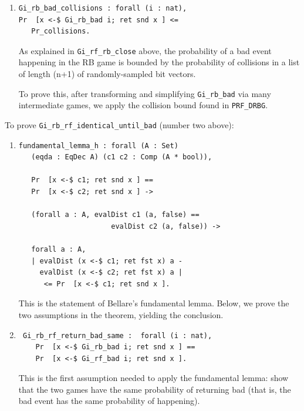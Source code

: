 \documentclass[12pt,lot, lof]{puthesis}
\newcommand{\li} {\lstinline}
\begin{document}
{\begin{enumerate}
                                              
\par
\item \begin{lstlisting}
Gi_rb_bad_collisions : forall (i : nat),
Pr  [x <-$ Gi_rb_bad i; ret snd x ] <= 
   Pr_collisions.
\end{lstlisting}

As explained in \li|Gi_rf_rb_close| above, the probability of a bad event happening in the RB game is bounded by the probability of collisions in a list of length (n+1) of randomly-sampled bit vectors. 

To prove this, after transforming and simplifying \li|Gi_rb_bad| via many intermediate games, we apply the collision bound found in \li|PRF_DRBG|.

\end{enumerate} 

To prove \lstinline|Gi_rb_rf_identical_until_bad| (number two above):

\begin{enumerate}
\par
\item \begin{lstlisting}
fundamental_lemma_h : forall (A : Set) 
   (eqda : EqDec A) (c1 c2 : Comp (A * bool)),
   
   Pr  [x <-$ c1; ret snd x ] == 
   Pr  [x <-$ c2; ret snd x ] ->
   
   (forall a : A, evalDist c1 (a, false) == 
                      evalDist c2 (a, false)) ->
                      
   forall a : A,
   | evalDist (x <-$ c1; ret fst x) a - 
     evalDist (x <-$ c2; ret fst x) a |
      <= Pr  [x <-$ c1; ret snd x ].
\end{lstlisting}

This is the statement of Bellare's fundamental lemma. Below, we prove the two assumptions in the theorem, yielding the conclusion.

\par
\item \begin{lstlisting}
 Gi_rb_rf_return_bad_same :  forall (i : nat),
    Pr  [x <-$ Gi_rb_bad i; ret snd x ] ==
    Pr  [x <-$ Gi_rf_bad i; ret snd x ].
\end{lstlisting}

This is the first assumption needed to apply the fundamental lemma: show that the two games have the same probability of returning bad (that is, the bad event has the same probability of happening).


\end{enumerate}}
\end{document}
